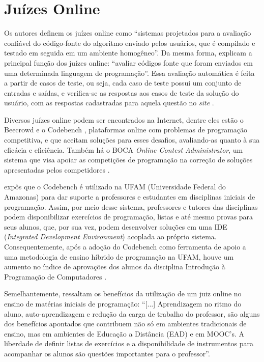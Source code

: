 \section{Juízes Online}

Os autores \textcite{wasik} definem os juízes online como “sistemas projetados para a avaliação confiável do código-fonte do algoritmo enviado pelos usuários, que é compilado e testado em seguida em um ambiente homogêneo”. Da mesma forma, \textcite[p.~1]{santosribeiro} explicam a principal função dos juízes online: “avaliar códigos fonte que foram enviados em uma determinada linguagem de programação”. Essa avaliação automática é feita a partir de casos de teste, ou seja, cada caso de teste possui um conjunto de entradas e saídas, e verifica-se as respostas aos casos de teste da solução do usuário, com as respostas cadastradas para aquela questão no \textit{site} \cite[p.~12]{franciscojuniorambrosio}. 

Diversos juízes online podem ser encontrados na Internet, dentre eles estão o Beecrowd \cite{cruz2022} e o Codebench \cite[p.~806]{ribeirofernandescarvalho}, plataformas online com problemas de programação competitiva, e que aceitam soluções para esses desafios, avaliando-as quanto à sua eficácia e eficiência. Também há o BOCA \textit{Online Contest Administrator}, um sistema que visa apoiar as competições de programação na correção de soluções apresentadas pelos competidores \cite{camposferreira}. 

\textcite[p.~807-808]{ribeirofernandescarvalho} expôs que o Codebench é utilizado na UFAM (Universidade Federal do Amazonas) para dar suporte a professores e estudantes em disciplinas iniciais de programação. Assim, por meio desse sistema, professores e tutores das disciplinas podem disponibilizar exercícios de programação, listas e até mesmo provas para seus alunos, que, por sua vez, podem desenvolver soluções em uma IDE (\textit{Integrated Development Environment}) acoplada ao próprio sistema. Consequentemente, após a adoção do Codebench como ferramenta de apoio a uma metodologia de ensino híbrido de programação na UFAM, houve um aumento no índice de aprovações dos alunos da disciplina Introdução à Programação de Computadores \cite[p.~148-149]{galvaofernandesgadelha}.

Semelhantemente, \textcite[p.~18-19]{franciscojuniorambrosio} ressaltam os benefícios da utilização de um juiz online no ensino de matérias iniciais de programação: “[...] Aprendizagem no ritmo do aluno, auto-aprendizagem e redução da carga de trabalho do professor, são alguns dos benefícios apontados que contribuem não só em ambientes tradicionais de ensino, mas em ambientes de Educação a Distância (EAD) e em MOOC’s. A liberdade de definir listas de exercícios e a disponibilidade de instrumentos para acompanhar os alunos são questões importantes para o professor”.

